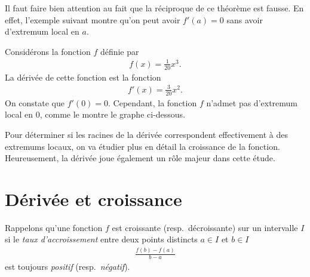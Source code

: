 \documentclass[main.tex]{subfiles}
\begin{document}
Il faut faire bien attention au fait que la réciproque de ce théorème est fausse.
En effet, l'exemple suivant montre qu'on peut avoir $f'(a) = 0$ sans avoir d'extremum local en $a$.

\begin{example}
    Considérons la fonction $f$ définie par
    \begin{align}
        f(x) = \frac 1 {20} x^3.
    \end{align}
    La dérivée de cette fonction est la fonction
    \begin{align}
        f'(x) = \frac 3 {20} x^2.
    \end{align}
    On constate que $f'(0) = 0$.
    Cependant, la fonction $f$ n'admet pas d'extremum local en $0$,
    comme le montre le graphe ci-dessous.

    \begin{plot}{0.3}{-6}{-6}{6}{6}
        \def\f{1/20*(\x)^3}
        \def\der{3/20*(\x)^2}
        \plotfunction{-6:6}{\f}
        \drawtangent{\f}{\der}{0}{-2:2}
    \end{plot}
\end{example}

Pour déterminer si les racines de la dérivée correspondent effectivement à des extremums locaux,
on va étudier plus en détail la croissance de la fonction.
Heureusement, la dérivée joue également un rôle majeur dans cette étude.

\section{Dérivée et croissance}

Rappelons qu'une fonction $f$ est croissante (resp.\ décroissante) sur un intervalle $I$
si le \emph{taux d'accroissement} entre deux points distincts $a \in I$ et $b \in I$
\begin{align}
    \frac {f(b) - f(a)} {b - a}
\end{align}
est toujours \emph{positif} (resp.\ \emph{négatif}).
\end{document}
